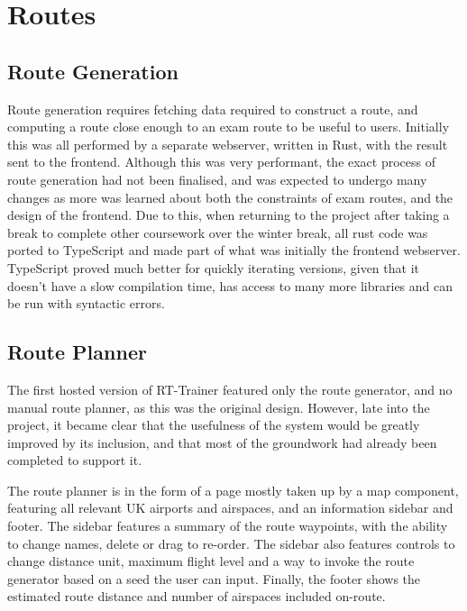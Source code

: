 \section{Routes}
\label{se:routes}
\subsection{Route Generation}
\label{sse:routegen}

Route generation requires fetching data required to construct a route, and computing a route close enough to an exam route to be useful to users. Initially this was all performed by a separate webserver, written in Rust, with the result sent to the frontend. Although this was very performant, the exact process of route generation had not been finalised, and was expected to undergo many changes as more was learned about both the constraints of exam routes, and the design of the frontend. Due to this, when returning to the project after taking a break to complete other coursework over the winter break, all rust code was ported to TypeScript and made part of what was initially the frontend webserver. TypeScript proved much better for quickly iterating versions, given that it doesn't have a slow compilation time, has access to many more libraries and can be run with syntactic errors. 


\subsection{Route Planner}
\label{sse:routeplanner}

The first hosted version of RT-Trainer featured only the route generator, and no manual route planner, as this was the original design. However, late into the project, it became clear that the usefulness of the system would be greatly improved by its inclusion, and that most of the groundwork had already been completed to support it. 

The route planner is in the form of a page mostly taken up by a map component, featuring all relevant UK airports and airspaces, and an information sidebar and footer. The sidebar features a summary of the route waypoints, with the ability to change names, delete or drag to re-order. The sidebar also features controls to change distance unit, maximum flight level and a way to invoke the route generator based on a seed the user can input. Finally, the footer shows the estimated route distance and number of airspaces included on-route.

